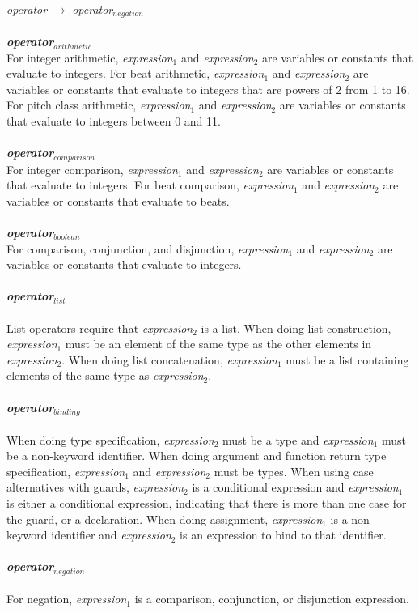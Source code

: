     \emph{operator} $\rightarrow$ \emph{operator$_{negation}$} \\ \\
\textbf{\emph{operator$_{arithmetic}$}} \\
For integer arithmetic, \emph{expression$_{1}$} and \emph{expression$_{2}$} are variables or constants that evaluate to integers. For beat arithmetic, \emph{expression$_{1}$} and \emph{expression$_{2}$} are variables or constants that evaluate to integers that are powers of 2 from 1 to 16. For pitch class arithmetic, \emph{expression$_{1}$} and \emph{expression$_{2}$} are variables or constants that evaluate to integers between 0 and 11.  \\ \\
\textbf{\emph{operator$_{comparison}$}} \\
For integer comparison, \emph{expression$_{1}$} and \emph{expression$_{2}$} are variables or constants that evaluate to integers. For beat comparison, \emph{expression$_{1}$} and \emph{expression$_{2}$} are variables or constants that evaluate to beats. \\ \\
\textbf{\emph{operator$_{boolean}$}} \\
For comparison, conjunction, and disjunction, \emph{expression$_{1}$} and \emph{expression$_{2}$} are variables or constants that evaluate to integers. \\ \\
\textbf{\emph{operator$_{list}$}} \\ \\
List operators require that  \emph{expression$_{2}$} is a list. When doing list construction,  \emph{expression$_{1}$} must be an element of the same type as the other elements in  \emph{expression$_{2}$}. When doing list concatenation,  \emph{expression$_{1}$} must be a list containing elements of the same type as  \emph{expression$_{2}$}. \\ \\
\textbf{\emph{operator$_{binding}$}} \\ \\
When doing type specification, \emph{expression$_{2}$} must be a type and \emph{expression$_{1}$} must be a non-keyword identifier. When doing argument and function return type specification, \emph{expression$_{1}$} and \emph{expression$_{2}$} must be types. When using case alternatives with guards,  \emph{expression$_{2}$} is a conditional expression and  \emph{expression$_{1}$} is either a conditional expression, indicating that there is more than one case for the guard, or a declaration. When doing assignment,  \emph{expression$_{1}$} is a non-keyword identifier and  \emph{expression$_{2}$} is an expression to bind to that identifier. \\ \\
\textbf{\emph{operator$_{negation}$}} \\ \\
For negation,  \emph{expression$_{1}$} is a comparison, conjunction, or disjunction expression.
    
